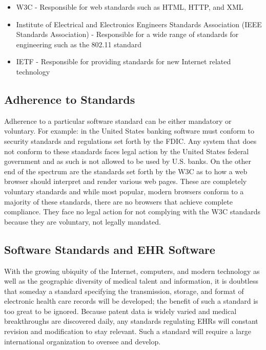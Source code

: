 \documentclass[14pt]{article}
\begin{document}

\begin{itemize}
\item \gls{W3C} - Responsible for web standards such as \gls{HTML}, \gls{HTTP}, and \gls{XML} 
\item Institute of Electrical and Electronics Engineers Standards Association (\gls{IEEE} Standards Association) - Responsible for a wide range of standards for engineering such as the 802.11 standard
\item \gls{IETF} - Responsible for providing standards for new Internet related technology 
\end{itemize}


\subsection{Adherence to Standards}
Adherence to a particular software standard can be either mandatory or voluntary. For example: in the United States banking software must conform to security standards and regulations set forth by the \gls{FDIC}. Any system that does not conform to these standards faces legal action by the United States federal government and as such is not allowed to be used by U.S. banks. On the other end of the spectrum are the standards set forth by the \gls{W3C} as to how a web browser should interpret and render various web pages. These are completely voluntary standards and while most popular, modern browsers conform to a majority of these standards, there are no browsers that achieve complete compliance. They face no legal action for not complying with the \gls{W3C} standards because they are voluntary, not legally mandated.

\subsection{Software Standards and EHR Software}
With the growing ubiquity of the Internet, computers, and modern technology as well as the geographic diversity of medical talent and information, it is doubtless that someday a standard specifying the transmission, storage, and format of electronic health care records will be developed; the benefit of such a standard is too great to be ignored. Because patent data is widely varied and medical breakthroughs are discovered daily, any standards regulating \glspl{EHR} will constant revision and modification to stay relevant. Such a standard will require a large international organization to oversee and develop.
\end{document}
